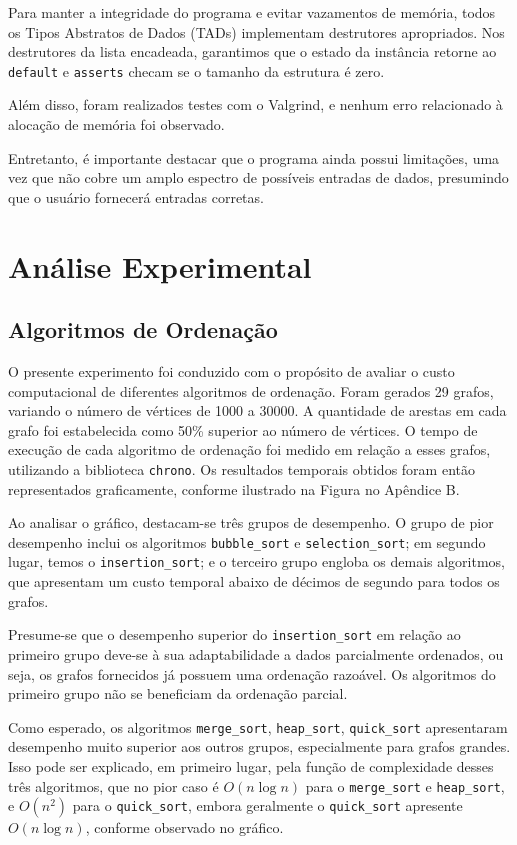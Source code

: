 \documentclass{article}
\begin{document}
Para manter a integridade do programa e evitar vazamentos de memória, todos os Tipos Abstratos de Dados (TADs) implementam destrutores apropriados. Nos destrutores da lista encadeada, garantimos que o estado da instância retorne ao \texttt{default} e \texttt{asserts} checam se o tamanho da estrutura é zero.

Além disso, foram realizados testes com o Valgrind, e nenhum erro relacionado à alocação de memória foi observado.

Entretanto, é importante destacar que o programa ainda possui limitações, uma vez que não cobre um amplo espectro de possíveis entradas de dados, presumindo que o usuário fornecerá entradas corretas. 


\section{Análise Experimental}

\subsection{Algoritmos de Ordenação}
O presente experimento foi conduzido com o propósito de avaliar o custo computacional de diferentes algoritmos de ordenação. Foram gerados 29 grafos, variando o número de vértices de 1000 a 30000. A quantidade de arestas em cada grafo foi estabelecida como 50\% superior ao número de vértices. O tempo de execução de cada algoritmo de ordenação foi medido em relação a esses grafos, utilizando a biblioteca \texttt{chrono}. Os resultados temporais obtidos foram então representados graficamente, conforme ilustrado na Figura no Apêndice B.



Ao analisar o gráfico, destacam-se três grupos de desempenho. O grupo de pior desempenho inclui os algoritmos \texttt{bubble\_sort} e \texttt{selection\_sort}; em segundo lugar, temos o \texttt{insertion\_sort}; e o terceiro grupo engloba os demais algoritmos, que apresentam um custo temporal abaixo de décimos de segundo para todos os grafos.

Presume-se que o desempenho superior do \texttt{insertion\_sort} em relação ao primeiro grupo deve-se à sua adaptabilidade a dados parcialmente ordenados, ou seja, os grafos fornecidos já possuem uma ordenação razoável. Os algoritmos do primeiro grupo não se beneficiam da ordenação parcial.

Como esperado, os algoritmos \texttt{merge\_sort}, \texttt{heap\_sort}, \texttt{quick\_sort} apresentaram desempenho muito superior aos outros grupos, especialmente para grafos grandes. Isso pode ser explicado, em primeiro lugar, pela função de complexidade desses três algoritmos, que no pior caso é \(O(n \log n)\) para o \texttt{merge\_sort} e \texttt{heap\_sort}, e \(O(n^2)\) para o \texttt{quick\_sort}, embora geralmente o \texttt{quick\_sort} apresente \(O(n \log n)\), conforme observado no gráfico.
\end{document}
